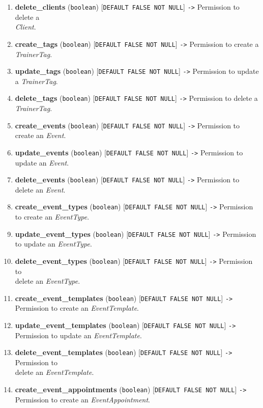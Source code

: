 \documentclass[a4paper, 12pt, oneside]{book}
\begin{document}
\begin{enumerate}[label = -]
	\item \textbf{delete\_clients} (\texttt{boolean}) [\texttt{DEFAULT FALSE NOT NULL}] \texttt{->} Permission to delete a\\\emph{Client}.
	\item \textbf{create\_tags} (\texttt{boolean}) [\texttt{DEFAULT FALSE NOT NULL}] \texttt{->} Permission to create a\\\emph{TrainerTag}.
	\item \textbf{update\_tags} (\texttt{boolean}) [\texttt{DEFAULT FALSE NOT NULL}] \texttt{->} Permission to update a \emph{TrainerTag}.
	\item \textbf{delete\_tags} (\texttt{boolean}) [\texttt{DEFAULT FALSE NOT NULL}] \texttt{->} Permission to delete a\\\emph{TrainerTag}.
	\item \textbf{create\_events} (\texttt{boolean}) [\texttt{DEFAULT FALSE NOT NULL}] \texttt{->} Permission to create an \emph{Event}.
	\item \textbf{update\_events} (\texttt{boolean}) [\texttt{DEFAULT FALSE NOT NULL}] \texttt{->} Permission to update an \emph{Event}.
	\item \textbf{delete\_events} (\texttt{boolean}) [\texttt{DEFAULT FALSE NOT NULL}] \texttt{->} Permission to\\delete an \emph{Event}.
	\item \textbf{create\_event\_types} (\texttt{boolean}) [\texttt{DEFAULT FALSE NOT NULL}] \texttt{->} Permission to create an \emph{EventType}.
	\item \textbf{update\_event\_types} (\texttt{boolean}) [\texttt{DEFAULT FALSE NOT NULL}] \texttt{->} Permission to update an \emph{EventType}.
	\item \textbf{delete\_event\_types} (\texttt{boolean}) [\texttt{DEFAULT FALSE NOT NULL}] \texttt{->} Permission to\\delete an \emph{EventType}.
	\item \textbf{create\_event\_templates} (\texttt{boolean}) [\texttt{DEFAULT FALSE NOT NULL}] \texttt{->} Permission to create an \emph{EventTemplate}.
	\item \textbf{update\_event\_templates} (\texttt{boolean}) [\texttt{DEFAULT FALSE NOT NULL}] \texttt{->} Permission to update an \emph{EventTemplate}.
	\item \textbf{delete\_event\_templates} (\texttt{boolean}) [\texttt{DEFAULT FALSE NOT NULL}] \texttt{->} Permission to\\delete an \emph{EventTemplate}.
	\item \textbf{create\_event\_appointments} (\texttt{boolean}) [\texttt{DEFAULT FALSE NOT NULL}] \texttt{->} Permission to create an \emph{EventAppointment}.

\end{enumerate}
\end{document}

